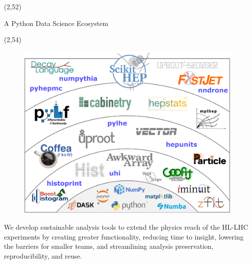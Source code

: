 \begin{textblock}{25.0}(2,52)
\begin{block}{A Python Data Science Ecosystem}
\begin{textblock}{25.0}(2,54)
\begin{figure}[tbph]
\centering
\includegraphics[width=1.00\textwidth]{images/scikit-hep-shells-hep.png}
\end{figure}
We develop sustainable analysis tools to extend the physics reach of the HL-LHC experiments by creating greater functionality, reducing time to insight, lowering the barriers for smaller teams, and streamlining analysis preservation, reproducibility, and reuse.
\end{textblock}
\end{block}
\end{textblock}
